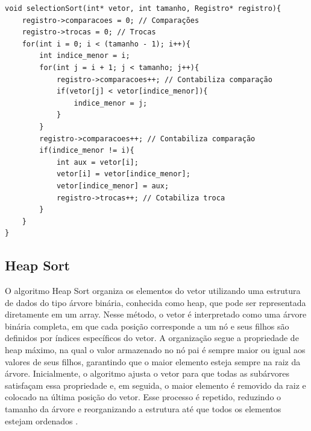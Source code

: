 \documentclass[12pt]{article}
\begin{document}
\newpage

\begin{lstlisting}
void selectionSort(int* vetor, int tamanho, Registro* registro){	
    registro->comparacoes = 0; // Comparações
    registro->trocas = 0; // Trocas 
    for(int i = 0; i < (tamanho - 1); i++){
        int indice_menor = i;
        for(int j = i + 1; j < tamanho; j++){
            registro->comparacoes++; // Contabiliza comparação
            if(vetor[j] < vetor[indice_menor]){
                indice_menor = j;
            }
        }
        registro->comparacoes++; // Contabiliza comparação
        if(indice_menor != i){
            int aux = vetor[i];
            vetor[i] = vetor[indice_menor];
            vetor[indice_menor] = aux;
            registro->trocas++; // Cotabiliza troca
        }
    }
}
\end{lstlisting}

\subsection{Heap Sort}

O algoritmo Heap Sort organiza os elementos do vetor utilizando uma estrutura de dados do tipo árvore binária, conhecida como heap, que pode ser representada diretamente em um array. Nesse método, o vetor é interpretado como uma árvore binária completa, em que cada posição corresponde a um nó e seus filhos são definidos por índices específicos do vetor. A organização segue a propriedade de heap máximo, na qual o valor armazenado no nó pai é sempre maior ou igual aos valores de seus filhos, garantindo que o maior elemento esteja sempre na raiz da árvore. Inicialmente, o algoritmo ajusta o vetor para que todas as subárvores satisfaçam essa propriedade e, em seguida, o maior elemento é removido da raiz e colocado na última posição do vetor. Esse processo é repetido, reduzindo o tamanho da árvore e reorganizando a estrutura até que todos os elementos estejam ordenados \cite{cormen2009}.

\newpage
\end{document}
